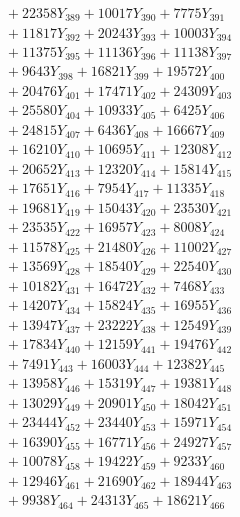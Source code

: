 \documentclass[a4paper,10pt]{article}
\begin{document}
{\begin{align}
&\;  + 22358 Y_{389} + 10017 Y_{390} + 7775 Y_{391} \\[0.3ex]
&\;  + 11817 Y_{392} + 20243 Y_{393} + 10003 Y_{394} \\[0.3ex]
&\;  + 11375 Y_{395} + 11136 Y_{396} + 11138 Y_{397} \\[0.3ex]
&\;  + 9643 Y_{398} + 16821 Y_{399} + 19572 Y_{400} \\[0.3ex]
&\;  + 20476 Y_{401} + 17471 Y_{402} + 24309 Y_{403} \\[0.3ex]
&\;  + 25580 Y_{404} + 10933 Y_{405} + 6425 Y_{406} \\[0.3ex]
&\;  + 24815 Y_{407} + 6436 Y_{408} + 16667 Y_{409} \\[0.3ex]
&\;  + 16210 Y_{410} + 10695 Y_{411} + 12308 Y_{412} \\[0.3ex]
&\;  + 20652 Y_{413} + 12320 Y_{414} + 15814 Y_{415} \\[0.3ex]
&\;  + 17651 Y_{416} + 7954 Y_{417} + 11335 Y_{418} \\[0.5ex]\allowbreak
&\;  + 19681 Y_{419} + 15043 Y_{420} + 23530 Y_{421} \\[0.3ex]
&\;  + 23535 Y_{422} + 16957 Y_{423} + 8008 Y_{424} \\[0.3ex]
&\;  + 11578 Y_{425} + 21480 Y_{426} + 11002 Y_{427} \\[0.3ex]
&\;  + 13569 Y_{428} + 18540 Y_{429} + 22540 Y_{430} \\[0.3ex]
&\;  + 10182 Y_{431} + 16472 Y_{432} + 7468 Y_{433} \\[0.3ex]
&\;  + 14207 Y_{434} + 15824 Y_{435} + 16955 Y_{436} \\[0.3ex]
&\;  + 13947 Y_{437} + 23222 Y_{438} + 12549 Y_{439} \\[0.3ex]
&\;  + 17834 Y_{440} + 12159 Y_{441} + 19476 Y_{442} \\[0.3ex]
&\;  + 7491 Y_{443} + 16003 Y_{444} + 12382 Y_{445} \\[0.3ex]
&\;  + 13958 Y_{446} + 15319 Y_{447} + 19381 Y_{448} \\[0.5ex]\allowbreak
&\;  + 13029 Y_{449} + 20901 Y_{450} + 18042 Y_{451} \\[0.3ex]
&\;  + 23444 Y_{452} + 23440 Y_{453} + 15971 Y_{454} \\[0.3ex]
&\;  + 16390 Y_{455} + 16771 Y_{456} + 24927 Y_{457} \\[0.3ex]
&\;  + 10078 Y_{458} + 19422 Y_{459} + 9233 Y_{460} \\[0.3ex]
&\;  + 12946 Y_{461} + 21690 Y_{462} + 18944 Y_{463} \\[0.3ex]
&\;  + 9938 Y_{464} + 24313 Y_{465} + 18621 Y_{466} \\[0.3ex]

\end{align}}
\end{document}
